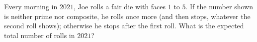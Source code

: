 Every morning in $2021$, Joe rolls a fair die with faces $1$ to $5$. If the number shown is neither prime nor composite, he rolls once more (and then stops, whatever the second roll shows); otherwise he stops after the first roll. What is the expected total number of rolls in $2021$?
